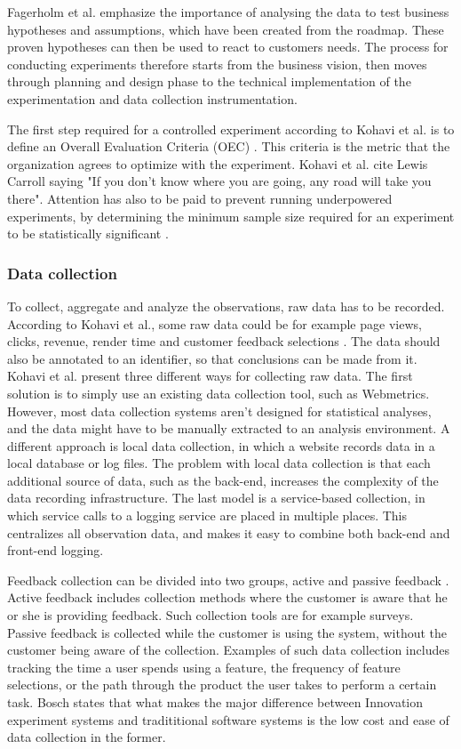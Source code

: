 \documentclass[english]{tktltiki2}
\theoremstyle{definition}
\theoremstyle{remark}
\begin{document}
Fagerholm et al. emphasize the importance of analysing the data to test business hypotheses and assumptions, which have been created from the roadmap. These proven hypotheses can then be used to react to customers needs. The process for conducting experiments therefore starts from the business vision, then moves through planning and design phase to the technical implementation of the experimentation and data collection instrumentation.  

The first step required for a controlled experiment according to Kohavi et al. is to define an Overall Evaluation Criteria (OEC) \cite{kohavi2009online}. This criteria is the metric that the organization agrees to optimize with the experiment. Kohavi et al. cite Lewis Carroll saying "If you don’t know where you are going, any road will take you there". Attention has also to be paid to prevent running underpowered experiments, by determining the minimum sample size required for an experiment to be statistically significant \cite{kohavi2009controlled}.

\subsubsection{Data collection} 
To collect, aggregate and analyze the observations, raw data has to be recorded. According to Kohavi et al., some raw data could be for example page views, clicks, revenue, render time and customer feedback selections \cite{kohavi2007practical}. The data should also be annotated to an identifier, so that conclusions can be made from it. Kohavi et al. present three different ways for collecting raw data. The first solution is to simply use an existing data collection tool, such as Webmetrics. However, most data collection systems aren't designed for statistical analyses, and the data might have to be manually extracted to an analysis environment. A different approach is local data collection, in which a website records data in a local database or log files. The problem with local data collection is that each additional source of data, such as the back-end, increases the complexity of the data recording infrastructure. The last model is a service-based collection, in which service calls to a logging service are placed in multiple places. This centralizes all observation data, and makes it easy to combine both back-end and front-end logging.

Feedback collection can be divided into two groups, active and passive feedback \cite{bosch2012building}. Active feedback includes collection methods where the customer is aware that he or she is providing feedback. Such collection tools are for example surveys. Passive feedback is collected while the customer is using the system, without the customer being aware of the collection. Examples of such data collection includes tracking the time a user spends using a feature, the frequency of feature selections, or the path through the product the user takes to perform a certain task. Bosch states that what makes the major difference between Innovation experiment systems and tradititional software systems is the low cost and ease of data collection in the former. 
\end{document}
